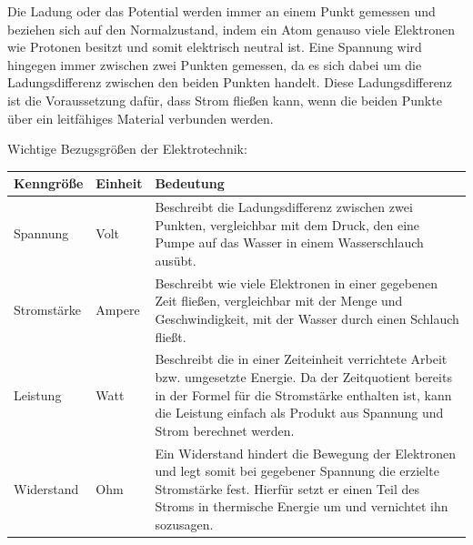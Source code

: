 Die Ladung oder das Potential werden immer an einem Punkt gemessen und beziehen
sich auf den Normalzustand, indem ein Atom genauso viele Elektronen wie Protonen
besitzt und somit elektrisch neutral ist. Eine Spannung wird hingegen immer zwischen
zwei Punkten gemessen, da es sich dabei um die Ladungsdifferenz zwischen den beiden
Punkten handelt. Diese Ladungsdifferenz ist die Voraussetzung dafür, dass Strom
fließen kann, wenn die beiden Punkte über ein leitfähiges Material verbunden werden.

\bigskip
\teilaufgabe
Wichtige Bezugsgrößen der Elektrotechnik:

{
    \renewcommand{\arraystretch}{1.6}
    \medskip

    \begin{tabular}{|p{}|p{}|p{}|}
        \hline
        \textbf{Kenngröße} &
        \textbf{Einheit}   &
        \textbf{Bedeutung} \\

        \hline
        Spannung &
        Volt &
        Beschreibt die Ladungsdifferenz zwischen zwei Punkten, vergleichbar mit
        dem Druck, den eine Pumpe auf das Wasser in einem Wasserschlauch ausübt.
        \\

        \hline
        Stromstärke &
        Ampere &
        Beschreibt wie viele Elektronen in einer gegebenen Zeit fließen, vergleichbar
        mit der Menge und Geschwindigkeit, mit der Wasser durch einen Schlauch fließt.
        \\

        \hline
        Leistung &
        Watt &
        Beschreibt die in einer Zeiteinheit verrichtete Arbeit bzw. umgesetzte Energie.
        Da der Zeitquotient bereits in der Formel für die Stromstärke enthalten ist,
        kann die Leistung einfach als Produkt aus Spannung und Strom berechnet werden.
        \\

        \hline
        Widerstand &
        Ohm &
        Ein Widerstand hindert die Bewegung der Elektronen und legt somit bei
        gegebener Spannung die erzielte Stromstärke fest. Hierfür setzt er einen
        Teil des Stroms in thermische Energie um und \glqq{}vernichtet\grqq{}
        ihn sozusagen.
        \\

        \hline
    \end{tabular}

    \medskip
}


